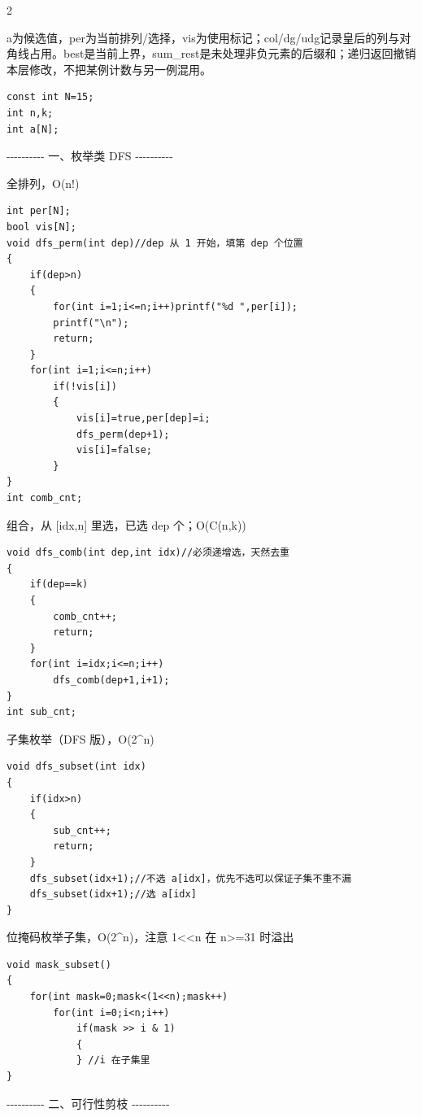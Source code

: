 \documentclass[UTF8,fontset=fandol,a4paper,twoside]{ctexart}
\newcommand{\note}[1]{{\fontsize{10}{12}\selectfont #1\par}}
\begin{document}
\begin{multicols}{2}
\note{a为候选值，per为当前排列/\allowbreak{}选择，vis为使用标记；col/\allowbreak{}dg/\allowbreak{}udg记录皇后的列与对角线占用。best是当前上界，sum\_rest是未处理非负元素的后缀和；递归返回撤销本层修改，不把某例计数与另一例混用。}
\begin{lstlisting}
const int N=15;
int n,k;
int a[N];
\end{lstlisting}
\note{-\allowbreak{}-\allowbreak{}-\allowbreak{}-\allowbreak{}-\allowbreak{}-\allowbreak{}-\allowbreak{}-\allowbreak{}-\allowbreak{}-\allowbreak{} 一、枚举类 DFS -\allowbreak{}-\allowbreak{}-\allowbreak{}-\allowbreak{}-\allowbreak{}-\allowbreak{}-\allowbreak{}-\allowbreak{}-\allowbreak{}-\allowbreak{}}
\note{全排列，O(\allowbreak{}n!)\allowbreak{}}
\begin{lstlisting}
int per[N];
bool vis[N];
void dfs_perm(int dep)//dep 从 1 开始，填第 dep 个位置
{
    if(dep>n)
    {
        for(int i=1;i<=n;i++)printf("%d ",per[i]);
        printf("\n");
        return;
    }
    for(int i=1;i<=n;i++)
        if(!vis[i])
        {
            vis[i]=true,per[dep]=i;
            dfs_perm(dep+1);
            vis[i]=false;
        }
}
int comb_cnt;
\end{lstlisting}
\note{组合，从 [\allowbreak{}idx,\allowbreak{}n]\allowbreak{} 里选，已选 dep 个；O(\allowbreak{}C(\allowbreak{}n,\allowbreak{}k)\allowbreak{})\allowbreak{}}
\begin{lstlisting}
void dfs_comb(int dep,int idx)//必须递增选，天然去重
{
    if(dep==k)
    {
        comb_cnt++;
        return;
    }
    for(int i=idx;i<=n;i++)
        dfs_comb(dep+1,i+1);
}
int sub_cnt;
\end{lstlisting}
\note{子集枚举（DFS 版），O(\allowbreak{}2\textasciicircum{}n)\allowbreak{}}
\begin{lstlisting}
void dfs_subset(int idx)
{
    if(idx>n)
    {
        sub_cnt++;
        return;
    }
    dfs_subset(idx+1);//不选 a[idx]，优先不选可以保证子集不重不漏
    dfs_subset(idx+1);//选 a[idx]
}
\end{lstlisting}
\note{位掩码枚举子集，O(\allowbreak{}2\textasciicircum{}n)\allowbreak{}，注意 1<\allowbreak{}<\allowbreak{}n 在 n>\allowbreak{}=\allowbreak{}31 时溢出}
\begin{lstlisting}
void mask_subset()
{
    for(int mask=0;mask<(1<<n);mask++)
        for(int i=0;i<n;i++)
            if(mask >> i & 1)
            {
            } //i 在子集里
}
\end{lstlisting}
\note{-\allowbreak{}-\allowbreak{}-\allowbreak{}-\allowbreak{}-\allowbreak{}-\allowbreak{}-\allowbreak{}-\allowbreak{}-\allowbreak{}-\allowbreak{} 二、可行性剪枝 -\allowbreak{}-\allowbreak{}-\allowbreak{}-\allowbreak{}-\allowbreak{}-\allowbreak{}-\allowbreak{}-\allowbreak{}-\allowbreak{}-\allowbreak{}}

\end{multicols}
\end{document}
